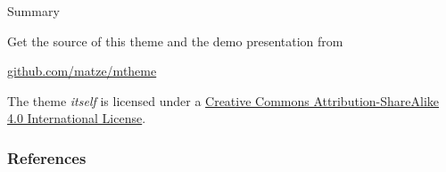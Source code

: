 \documentclass[10pt]{beamer}
\begin{document}
\begin{frame}{Summary}

  Get the source of this theme and the demo presentation from

  \begin{center}\url{github.com/matze/mtheme}\end{center}

  The theme \emph{itself} is licensed under a
  \href{http://creativecommons.org/licenses/by-sa/4.0/}{Creative Commons
  Attribution-ShareAlike 4.0 International License}.

  \begin{center}\ccbysa\end{center}

\end{frame}


\begin{frame}[allowframebreaks]

  \frametitle{References}

  
  

\end{frame}
\end{document}
